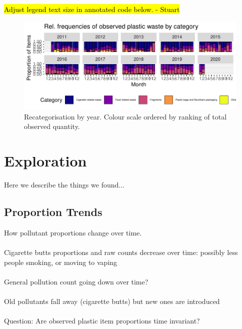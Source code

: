 \documentclass[10pt]{article}\usepackage[]{graphicx}\usepackage[]{color}
\newenvironment{knitrout}{}{} %
\begin{document}
\hl{Adjust legend text size in annotated code below. - Stuart}
\begin{figure}[H] %
\begin{center}
\begin{knitrout}\small
{}\color{fgcolor}
\includegraphics[width=1\linewidth]{figure/unnamed-chunk-9-1} 

\end{knitrout}
\caption {Recategorisation by year. Colour scale ordered by ranking of total observed quantity.}
\label{figB}
\end {center}
\end {figure}



\pagebreak
\section{Exploration}

Here we describe the things we found... 

\subsection{Proportion Trends}
How pollutant proportions change over time.\\
\\
Cigarette butts proportions and raw counts decrease over time: possibly less people smoking, or moving to vaping\\
\\
General pollution count going down over time?\\
\\
Old pollutants fall away (cigarette butts) but new ones are introduced\\
\\
Question: Are observed plastic item proportions time invariant?\\
\\
\end{document}
